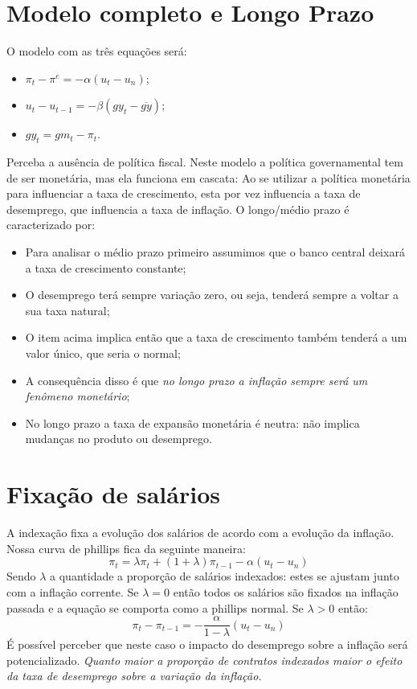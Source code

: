\documentclass[12pt,a4paper,oneside,brazil]{abntex2}
\begin{document}
\section{Modelo completo e Longo Prazo}
O modelo com as três equações será:
\begin{itemize}
\item $\pi_t - \pi^e  =  - \alpha (u_t - u_n)$;
\item $u_t - u_{t-1} = - \beta (gy_t - \overline{gy})$;
\item $gy_t = gm_t - \pi_t$.
\end{itemize}
Perceba a ausência de política fiscal. Neste modelo a política governamental tem de ser monetária, mas ela funciona em cascata: Ao se utilizar a política monetária para influenciar a taxa de crescimento, esta por vez influencia a taxa de desemprego, que influencia a taxa de inflação.
O longo/médio prazo é caracterizado por:
\begin{itemize}
\item Para analisar o médio prazo primeiro assumimos que o banco central deixará a taxa de crescimento constante;
\item O desemprego terá sempre variação zero, ou seja, tenderá sempre a voltar a sua taxa natural;
\item O item acima implica então que a taxa de crescimento também tenderá a um valor único, que seria o normal;
\item A consequência disso é que \emph{no longo prazo a inflação sempre será um fenômeno monetário};
\item No longo prazo a taxa de expansão monetária é neutra: não implica mudanças no produto ou desemprego.
\end{itemize}

\section{Fixação de salários}
A indexação fixa a evolução dos salários de acordo com a evolução da inflação. Nossa curva de phillips fica da seguinte maneira:
\[ \pi_t = \lambda \pi_t + (1 + \lambda) \pi_{t-1} - \alpha (u_t - u_n) \]
Sendo $\lambda$ a quantidade a proporção de salários indexados: estes se ajustam junto com a inflação corrente. Se  $\lambda = 0$ então todos os salários são fixados na inflação passada e a equação se comporta como a phillips normal. Se $\lambda >0$ então:
\[ \pi_t - \pi_{t-1} = - \frac{\alpha}{1- \lambda} (u_t - u_n) \]
É possível perceber que neste caso o impacto do desemprego sobre a inflação será potencializado. \emph{Quanto maior a proporção de contratos indexados maior o efeito da taxa de desemprego sobre a variação da inflação.}
\end{document}
